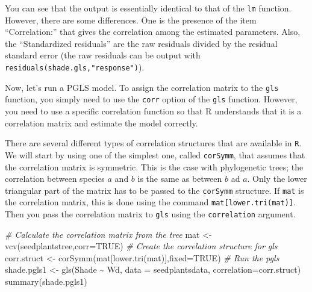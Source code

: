 \documentclass[
]{book}
\newenvironment{Shaded}{\begin{snugshade}}{\end{snugshade}}
\newcommand{\AttributeTok}[1]{\textcolor[rgb]{0.77,0.63,0.00}{#1}}
\newcommand{\CommentTok}[1]{\textcolor[rgb]{0.56,0.35,0.01}{\textit{#1}}}
\newcommand{\ConstantTok}[1]{\textcolor[rgb]{0.00,0.00,0.00}{#1}}
\newcommand{\FunctionTok}[1]{\textcolor[rgb]{0.00,0.00,0.00}{#1}}
\newcommand{\NormalTok}[1]{#1}
\newcommand{\OtherTok}[1]{\textcolor[rgb]{0.56,0.35,0.01}{#1}}
\newcommand{\SpecialCharTok}[1]{\textcolor[rgb]{0.00,0.00,0.00}{#1}}
\begin{document}
You can see that the output is essentially identical to that of the \texttt{lm} function. However, there are some differences. One is the presence of the item ``Correlation:'' that gives the correlation among the estimated parameters. Also, the ``Standardized residuals'' are the raw residuals divided by the residual standard error (the raw residuals can be output with \texttt{residuals(shade.gls,"response")}).

Now, let's run a PGLS model. To assign the correlation matrix to the \texttt{gls} function, you simply need to use the \texttt{corr} option of the \texttt{gls} function. However, you need to use a specific correlation function so that R understands that it is a correlation matrix and estimate the model correctly.

There are several different types of correlation structures that are available in \texttt{R}. We will start by using one of the simplest one, called \texttt{corSymm}, that assumes that the correlation matrix is symmetric. This is the case with phylogenetic trees; the correlation between species \(a\) and \(b\) is the same as between \(b\) ad \(a\). Only the lower triangular part of the matrix has to be passed to the \texttt{corSymm} structure. If \texttt{mat} is the correlation matrix, this is done using the command \texttt{mat{[}lower.tri(mat){]}}. Then you pass the correlation matrix to \texttt{gls} using the \texttt{correlation} argument.

\begin{Shaded}
\begin{Highlighting}[]
\CommentTok{\# Calculate the correlation matrix from the tree}
\NormalTok{mat }\OtherTok{\textless{}{-}} \FunctionTok{vcv}\NormalTok{(seedplantstree,}\AttributeTok{corr=}\ConstantTok{TRUE}\NormalTok{)}
\CommentTok{\# Create the correlation structure for gls}
\NormalTok{corr.struct }\OtherTok{\textless{}{-}} \FunctionTok{corSymm}\NormalTok{(mat[}\FunctionTok{lower.tri}\NormalTok{(mat)],}\AttributeTok{fixed=}\ConstantTok{TRUE}\NormalTok{)}
\CommentTok{\# Run the pgls}
\NormalTok{shade.pgls1 }\OtherTok{\textless{}{-}} \FunctionTok{gls}\NormalTok{(Shade }\SpecialCharTok{\textasciitilde{}}\NormalTok{ Wd, }\AttributeTok{data =}\NormalTok{ seedplantsdata, }\AttributeTok{correlation=}\NormalTok{corr.struct)}
\FunctionTok{summary}\NormalTok{(shade.pgls1)}
\end{Highlighting}
\end{Shaded}
\end{document}

